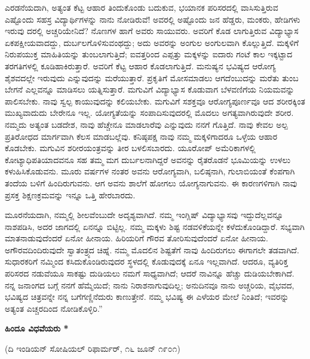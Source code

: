 ಎರಡನೆಯದಾಗಿ, ಅತ್ಯಂತ ಕೆಟ್ಟ ಆಹಾರ ತಿಂದುಕೊಂಡು ಬದುಕುವ, ಭಯಾನಕ ಪರಿಸರದಲ್ಲಿ ವಾಸಿಸುತ್ತಿರುವ ಎಷ್ಟೊಂದು ಸಹಸ್ರ ವಿದ್ಯಾರ್ಥಿಗಳನ್ನು ನಾನು ನೋಡಿರುವೆ! ಅವರಲ್ಲಿ ಅಷ್ಟೊಂದು ಜನ ಹೆಡ್ಡರು, ಮಂಕರು, ಹೇಡಿಗಳು ಇರುವು ದರಲ್ಲಿ ಅಚ್ಚರಿಯೇನಿದೆ? ನೊಣಗಳ ಹಾಗೆ ಅವರು ಸಾಯುವರು. ಅವರಿಗೆ ಕೊಡ ಲಾಗುತ್ತಿರುವ ವಿದ್ಯಾಭ್ಯಾಸ ಏಕಪಕ್ಷೀಯವಾದದ್ದು, ದುರ್ಬಲಗೊಳಿಸುವಂಥದ್ದು; ಅದು ಅವರನ್ನು ಅಂಗುಲ ಅಂಗುಲವಾಗಿ ಕೊಲ್ಲುತ್ತಿದೆ. ಮಕ್ಕಳಿಗೆ ನಿರುಪಯುಕ್ತ ಮಾಹಿತಿಯನ್ನು ತುಂಬಲಾಗುತ್ತಿದೆ; ಐವತ್ತರಿಂದ ಎಪ್ಪತ್ತು ಮಕ್ಕಳನ್ನು ಐದಾರು ಗಂಟೆ ಕಾಲ ಇಕ್ಕಟ್ಟಾದ ತರಗತಿಗಳಲ್ಲಿ ಕೂಡಿಹಾಕಿರುತ್ತಾರೆ. ಅವರಿಗೆ ಕೆಟ್ಟ ಆಹಾರ ಕೊಡಲಾಗುತ್ತಿದೆ. ಮನುಷ್ಯನ ಭವಿಷ್ಯದ ಆರೋಗ್ಯ ಶೈಶವದಲ್ಲೇ ಇರುವುದು ಎನ್ನುವುದನ್ನು ಮರೆಯುತ್ತಾರೆ. ಪ್ರಕೃತಿಗೆ ಮೋಸಮಾಡಲು ಆಗದೆಂಬುದನ್ನು ಮರೆತು ತುಂಬ ಬೇಗನೆ ಎಲ್ಲವನ್ನೂ ಮಾಡಿಸಲು ಯತ್ನಿಸುತ್ತಾರೆ. ಮಗುವಿಗೆ ವಿದ್ಯಾಭ್ಯಾಸ ಕೊಡುವಾಗ ಬೆಳವಣಿಗೆಯ ನಿಯಮವನ್ನು ಪಾಲಿಸಬೇಕು. ನಾವು ಸ್ವಲ್ಪ ಕಾಯುವುದನ್ನು ಕಲಿಯಬೇಕು. ಮಗುವಿಗೆ ಸಶಕ್ತವೂ ಆರೋಗ್ಯಪೂರ್ಣವೂ ಆದ ಶರೀರಕ್ಕಿಂತ ಮುಖ್ಯವಾದುದು ಬೇರೇನೂ ಇಲ್ಲ. ಯೋಗ್ಯತೆಯನ್ನು ಸಂಪಾದಿಸುವುದರಲ್ಲಿ ಮೊದಲು ಅಗತ್ಯವಾಗಿರುವುದೇ ಶರೀರ. ನಮ್ಮದು ಅತ್ಯಂತ ಬಡದೇಶ, ನಾವು ಹೆಚ್ಚೇನೂ ಮಾಡಲಾರೆವು ಎನ್ನುವುದು ನನಗೆ ಗೊತ್ತಿದೆ. ನಾವು ಕೇವಲ ಅಲ್ಪ ಪ್ರತಿರೋಧದ ಮಾರ್ಗವಾಗಿ ಕೆಲಸ ಮಾಡಬಲ್ಲೆವು. ಕನಿಷ್ಠಪಕ್ಷ ನಾವು ನಮ್ಮ ಮಕ್ಕಳಿಗಾದರೂ ಒಳ್ಳೆಯ ಆಹಾರ ಕೊಡಬೇಕು. ಮಗುವಿನ ಶರೀರಯಂತ್ರವನ್ನು ತೀರ ಬಳಲಿಸಬಾರದು. ಯೂರೋಪ್ ಅಮೆರಿಕಾಗಳಲ್ಲಿ ಕೋಟ್ಯಾಧಿಪತಿಯಾದವನೂ ಸಹ ತಮ್ಮ ಮಗ ದುರ್ಬಲನಾಗಿದ್ದರೆ ಅವನನ್ನು ರೈತರೊಡನೆ ಭೂಮಿಯನ್ನು ಉಳಲು ಕಳುಹಿಸಿಕೊಡುವನು. ಮೂರು ವರ್ಷಗಳ ನಂತರ ಅವನು ಆರೋಗ್ಯವಾಗಿ, ಬಲಿಷ್ಠನಾಗಿ, ಗುಲಾಬಿಯಂತೆ ಕೆಂಪಗಾಗಿ ತಂದೆಯ ಬಳಿಗೆ ಹಿಂದಿರುಗುವನು. ಆಗ ಅವನು ಶಾಲೆಗೆ ಹೋಗಲು ಯೋಗ್ಯನಾಗುವನು. ಈ ಕಾರಣಗಳಿಗಾಗಿ ನಾವು ಪ್ರಸಕ್ತ ಶಿಕ್ಷಣಕ್ರಮವನ್ನು ಇನ್ನೂ ಒತ್ತಿ ಹೇರಬಾರದು.

ಮೂರನೆಯದಾಗಿ, ನಮ್ಮಲ್ಲಿ ಶೀಲವೆಂಬುದೇ ಅದೃಶ್ಯವಾಗಿದೆ. ನಮ್ಮ ಇಂಗ್ಲಿಷ್ ವಿದ್ಯಾಭ್ಯಾಸವು ಇದ್ದುದೆಲ್ಲವನ್ನೂ ನಾಶಪಡಿಸಿ, ಅದರ ಜಾಗದಲ್ಲಿ ಏನನ್ನೂ ಬಿಟ್ಟಿಲ್ಲ. ನಮ್ಮ ಮಕ್ಕಳು ಶಿಷ್ಟ ನಡವಳಿಕೆಯನ್ನೇ ಕಳೆದುಕೊಂಡಿದ್ದಾರೆ. ಸಭ್ಯವಾಗಿ ಮಾತನಾಡುವುದೆಂದರೆ ಏನೋ ಹೀನಾಯ. ಹಿರಿಯರಿಗೆ ಗೌರವ ತೋರಿಸುವುದೆಂದರೆ ಏನೋ ಹೀನಾಯ. ಅಗೌರವದಿಂದಿರುವುದೇ ಸ್ವಾತಂತ್ರ್ಯದ ಚಿಹ್ನೆ. ನಮ್ಮ ಮೊದಲಿನ ಶಿಷ್ಟತೆಗೆ ನಾವು ಹಿಂದಿರುಗಲು ಈಗಾಗಲೇ ತಡವಾಗಿದೆ. ಸುಧಾರಕರಿಗೆ ನಮ್ಮಿಂದ ಕಸಿದುಕೊಂಡಿರುವುದರ ಸ್ಥಳದಲ್ಲಿ ಕೊಡುವುದಕ್ಕೆ ಏನೂ ಇಲ್ಲವಾಗಿದೆ. ಆದರೂ, ವ್ಯತಿರಿಕ್ತ ಪರಿಸರದ ನಡುವೆಯೂ ಸಾಕಷ್ಟು ದುಡಿಯಲು ನಮಗೆ ಸಾಧ್ಯವಾಗಿದೆ; ಆದರೆ ನಾವಿನ್ನೂ ಹೆಚ್ಚು ದುಡಿಯಬೇಕಾಗಿದೆ. ನನ್ನ ಜನಾಂಗದ ಬಗ್ಗೆ ನನಗೆ ಹೆಮ್ಮೆಯಿದೆ; ನಾನು ನಿರಾಶನಾಗುವುದಿಲ್ಲ; ಅನುದಿನವೂ ನಾನು ಅಚ್ಚರಿಯ, ವೈಭವದ, ಭವಿಷ್ಯದ ಚಿತ್ರವನ್ನೇ ನನ್ನ ಬಗೆಗಣ್ಣಿನೆದುರು ಕಾಣುತ್ತೇನೆ. ನಮ್ಮ ಭವಿಷ್ಯ ಈ ಎಳೆಯರ ಮೇಲೆ ನಿಂತಿದೆ; ಇವರನ್ನು ಅತ್ಯಂತ ಎಚ್ಚರದಿಂದ ನೋಡಿಕೊಳ್ಳಿರಿ.”

\begin{center}
\textbf{ಹಿಂದೂ ವಿಧವೆಯರು *}
\end{center}

\begin{center}
(ದಿ ಇಂಡಿಯನ್ ಸೋಷಿಯಲ್ ರಿಫಾರ್ಮರ್, ೧೬ ಜೂನ್ ೧೯೦೧)
\end{center}

